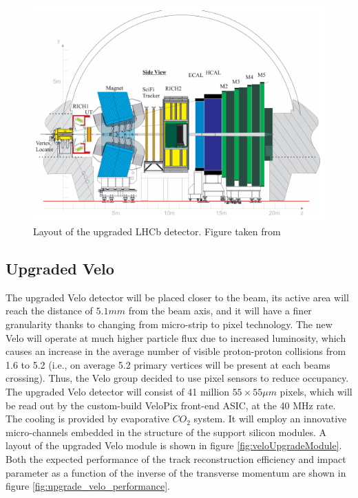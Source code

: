\begin{figure}[!h]
\centering
\includegraphics[width=\linewidth]{figures/LHCb_upgrade.PNG}
\caption{Layout of the upgraded LHCb detector. Figure taken from \cite{upgrade_tracker_tdr}
\label{fig:lhcb_upgrade}}
\end{figure}

\subsection{Upgraded Velo}
The upgraded Velo detector will be placed closer to the beam, its active area will reach the distance of $5.1 mm$ from the beam axis, and it will have a finer granularity thanks to changing from micro-strip to pixel technology. The new Velo will operate at much higher particle flux due to increased luminosity, which causes an increase in the average number of visible proton-proton collisions from 1.6 to 5.2 (i.e., on average 5.2 primary vertices will be present at each beams crossing). Thus, the Velo group decided to use pixel sensors to reduce occupancy. The upgraded Velo detector will consist of 41 million $55\times 55 \mu m$ pixels, which will be read out by the custom-build VeloPix front-end ASIC, at the 40 MHz rate. 
The cooling is provided by evaporative $CO_{2}$ system. It will employ an innovative micro-channels embedded in the structure of the support silicon modules.
A layout of the upgraded Velo module is shown in figure \ref{fig:veloUpgradeModule}. 
Both the expected performance of the track reconstruction efficiency and impact parameter as a function of the inverse of the transverse momentum are shown in figure \ref{fig:upgrade_velo_performance}.    


